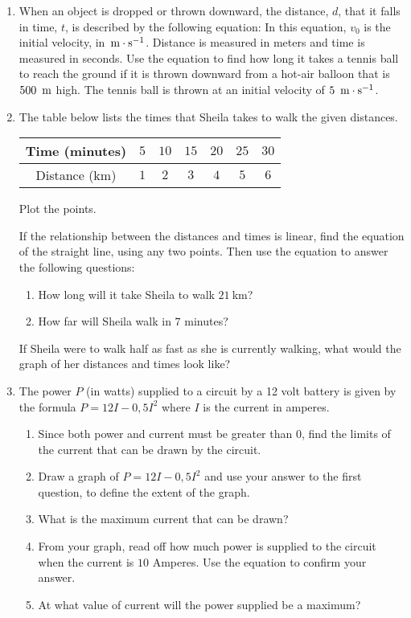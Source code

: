 \begin{eocexercises}{}
\begin{enumerate}
\item{When an object is dropped or thrown downward, the distance, $d$, that it falls in time, $t$, is described by the following equation:
In this equation, $v_0$ is the initial velocity, in $\,\mathrm{m \cdot s^{-1}}$. Distance is measured in meters and time is measured in seconds. Use the equation to find how long it takes a tennis ball to reach the ground if it is thrown downward from a hot-air balloon that is $500~\,\rm{m}$ high. The tennis ball is thrown at an initial velocity of $5~\,\mathrm{m \cdot s^{-1}}$.}

\item{The table below lists the times that Sheila takes to walk the given distances.
\begin{center}
\begin{tabular}{|c|c|c|c|c|c|c|}\hline
Time (minutes)& $5$ & $10$ & $15$ &$20$ &$25$ &$30$\\\hline
Distance (km)& $1$ & $2$ & $3$ & $4$ & $5$ &$6$\\\hline
\end{tabular}
\end{center}

Plot the points.

If the relationship between the distances and times is linear, find the equation of the straight line, using any two points. Then use the equation to answer the following questions:
\begin{enumerate}
\item How long will it take Sheila to walk $21~$km?
\item How far will Sheila walk in $7$ minutes?
\end{enumerate}
If Sheila were to walk half as fast as she is currently walking, what would the graph of her distances and times look like?}

\item{The power $P$ (in watts) supplied to a circuit by a 12 volt battery is given by the formula $P = 12I - 0,5I^2$ where $I$ is the current in amperes.
\begin{enumerate}
\item{Since both power and current must be greater than $0$, find the limits of the current that can be drawn by the circuit.}
\item{Draw a graph of $P = 12I - 0,5I^2$ and use your answer to the first question, to define the extent of the graph.}
\item{What is the maximum current that can be drawn?}
\item{From your graph, read off how much power is supplied to the circuit when the current is $10$ Amperes. Use the equation to confirm your answer.}
\item{At what value of current will the power supplied be a maximum?}
\end{enumerate}
}


\end{enumerate}
\end{eocexercises}
